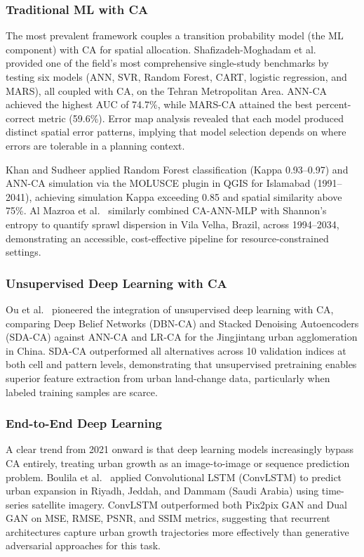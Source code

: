 \documentclass[conference]{IEEEtran}
\begin{document}
\subsubsection{Traditional ML with CA}
The most prevalent framework couples a transition probability model (the ML component) with CA for spatial allocation. Shafizadeh-Moghadam et al.\ \cite{shafizadeh2017} provided one of the field's most comprehensive single-study benchmarks by testing six models (ANN, SVR, Random Forest, CART, logistic regression, and MARS), all coupled with CA, on the Tehran Metropolitan Area. ANN-CA achieved the highest AUC of 74.7\%, while MARS-CA attained the best percent-correct metric (59.6\%). Error map analysis revealed that each model produced distinct spatial error patterns, implying that model selection depends on where errors are tolerable in a planning context.

Khan and Sudheer \cite{khan2022} applied Random Forest classification (Kappa 0.93--0.97) and ANN-CA simulation via the MOLUSCE plugin in QGIS for Islamabad (1991--2041), achieving simulation Kappa exceeding 0.85 and spatial similarity above 75\%. Al Mazroa et al.\ \cite{almazroa2024} similarly combined CA-ANN-MLP with Shannon's entropy to quantify sprawl dispersion in Vila Velha, Brazil, across 1994--2034, demonstrating an accessible, cost-effective pipeline for resource-constrained settings.

\subsubsection{Unsupervised Deep Learning with CA}
Ou et al.\ \cite{ou2019} pioneered the integration of unsupervised deep learning with CA, comparing Deep Belief Networks (DBN-CA) and Stacked Denoising Autoencoders (SDA-CA) against ANN-CA and LR-CA for the Jingjintang urban agglomeration in China. SDA-CA outperformed all alternatives across 10 validation indices at both cell and pattern levels, demonstrating that unsupervised pretraining enables superior feature extraction from urban land-change data, particularly when labeled training samples are scarce.

\subsubsection{End-to-End Deep Learning}
A clear trend from 2021 onward is that deep learning models increasingly bypass CA entirely, treating urban growth as an image-to-image or sequence prediction problem. Boulila et al.\ \cite{boulila2021} applied Convolutional LSTM (ConvLSTM) to predict urban expansion in Riyadh, Jeddah, and Dammam (Saudi Arabia) using time-series satellite imagery. ConvLSTM outperformed both Pix2pix GAN and Dual GAN on MSE, RMSE, PSNR, and SSIM metrics, suggesting that recurrent architectures capture urban growth trajectories more effectively than generative adversarial approaches for this task.
\end{document}
